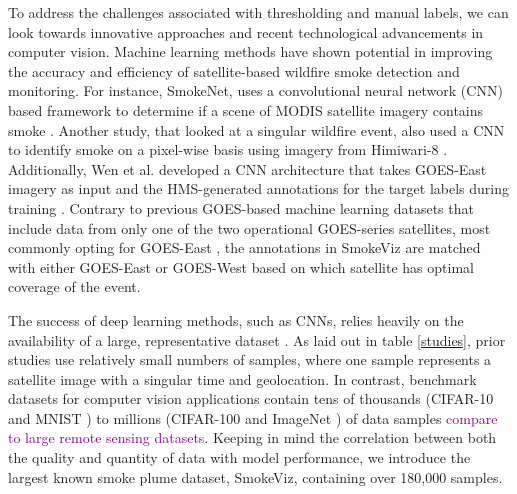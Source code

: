 \documentclass{article}
\newcommand\reynotes[1]{\textcolor{purple}{#1}}
\begin{document}
To address the challenges associated with thresholding and manual labels, we can look towards innovative approaches and recent technological advancements in computer vision. Machine learning methods have shown potential in improving the accuracy and efficiency of satellite-based wildfire smoke detection and monitoring. For instance, SmokeNet, uses a convolutional neural network (CNN) based framework to determine if a scene of MODIS satellite imagery contains smoke \cite{smokenet}. Another study, that looked at a singular wildfire event, also used a CNN to identify smoke on a pixel-wise basis using imagery from Himiwari-8 \cite{larsen}. Additionally, Wen et al. developed a CNN architecture that takes GOES-East imagery as input and the HMS-generated annotations for the target labels during training \cite{smoke_goes}. Contrary to previous GOES-based machine learning datasets that include data from only one of the two operational GOES-series satellites, most commonly opting for GOES-East \cite{smoke_goes, wildfire_detect, goes_conv, contrail}, the annotations in SmokeViz are matched with either GOES-East or GOES-West based on which satellite has optimal coverage of the event. 

The success of deep learning methods, such as CNNs, relies heavily on the availability of a large, representative dataset \cite{data_size}. As laid out in table \ref{studies}, prior studies use relatively small numbers of samples, where one sample represents a satellite image with a singular time and geolocation. In contrast, benchmark datasets for computer vision applications contain tens of thousands (CIFAR-10 \cite{cifar} and MNIST \cite{mnist}) to millions (CIFAR-100 and ImageNet \cite{imgnet}) of data samples \reynotes{compare to large remote sensing datasets}. Keeping in mind the correlation between both the quality and quantity of data with model performance, we introduce the largest known smoke plume dataset, SmokeViz, containing over 180,000 samples.
\end{document}
